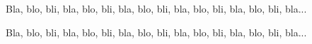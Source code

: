 \documentclass{article}
\begin{document}
\begin{caution}
  Bla, blo, bli, bla, blo, bli, bla, blo, bli, bla, blo, bli, bla, blo, bli, bla...
\end{caution}

\begin{warning}
  Bla, blo, bli, bla, blo, bli, bla, blo, bli, bla, blo, bli, bla, blo, bli, bla...
\end{warning}
\end{document}
